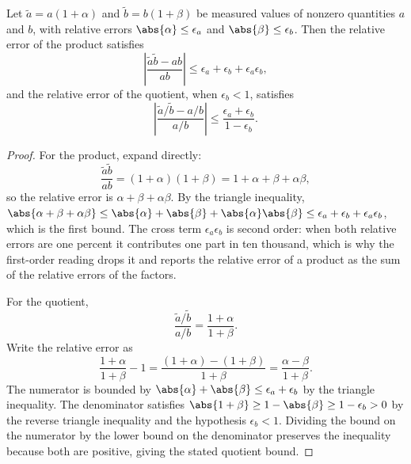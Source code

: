 \begin{theorem}
Let $\tilde a = a(1 + \alpha)$ and $\tilde b = b(1 + \beta)$ be
measured values of nonzero quantities $a$ and $b$, with relative errors
$\abs{\alpha} \leq \epsilon_{a}$ and $\abs{\beta} \leq \epsilon_{b}$.
Then the relative error of the product satisfies
\[
\left\lvert \frac{\tilde a \tilde b - ab}{ab} \right\rvert
\leq \epsilon_{a} + \epsilon_{b} + \epsilon_{a}\epsilon_{b},
\]
and the relative error of the quotient, when $\epsilon_{b} < 1$,
satisfies
\[
\left\lvert \frac{\tilde a / \tilde b - a/b}{a/b} \right\rvert
\leq \frac{\epsilon_{a} + \epsilon_{b}}{1 - \epsilon_{b}}.
\]
\end{theorem}

\begin{proof}
For the product, expand directly:
\[
\frac{\tilde a \tilde b}{ab}
= (1 + \alpha)(1 + \beta)
= 1 + \alpha + \beta + \alpha\beta,
\]
so the relative error is $\alpha + \beta + \alpha\beta$. By the triangle
inequality, $\abs{\alpha + \beta + \alpha\beta} \leq \abs{\alpha} +
\abs{\beta} + \abs{\alpha}\abs{\beta} \leq \epsilon_{a} + \epsilon_{b} +
\epsilon_{a}\epsilon_{b}$, which is the first bound. The cross term
$\epsilon_{a}\epsilon_{b}$ is second order: when both relative errors
are one percent it contributes one part in ten thousand, which is why
the first-order reading drops it and reports the relative error of a
product as the sum of the relative errors of the factors.

For the quotient,
\[
\frac{\tilde a / \tilde b}{a/b}
= \frac{1 + \alpha}{1 + \beta}.
\]
Write the relative error as
\[
\frac{1 + \alpha}{1 + \beta} - 1
= \frac{(1 + \alpha) - (1 + \beta)}{1 + \beta}
= \frac{\alpha - \beta}{1 + \beta}.
\]
The numerator is bounded by $\abs{\alpha} + \abs{\beta} \leq
\epsilon_{a} + \epsilon_{b}$ by the triangle inequality. The
denominator satisfies $\abs{1 + \beta} \geq 1 - \abs{\beta} \geq 1 -
\epsilon_{b} > 0$ by the reverse triangle inequality and the hypothesis
$\epsilon_{b} < 1$. Dividing the bound on the numerator by the lower
bound on the denominator preserves the inequality because both are
positive, giving the stated quotient bound.
\end{proof}


